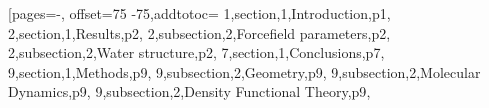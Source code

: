 

[pages=-, offset=75 -75,addtotoc={
     1,section,1,Introduction,p1,
     2,section,1,Results,p2,
     2,subsection,2,Forcefield parameters,p2,
     2,subsection,2,Water structure,p2,
     7,section,1,Conclusions,p7,
     9,section,1,Methods,p9,
     9,subsection,2,Geometry,p9,
     9,subsection,2,Molecular Dynamics,p9,
     9,subsection,2,Density Functional Theory,p9},
